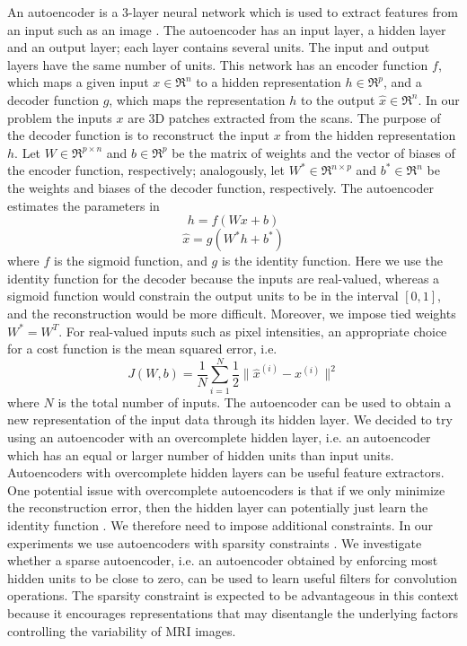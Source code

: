 \documentclass[a4paper,10pt]{article}
\begin{document}
\noindent An autoencoder is a 3-layer neural network which is used to extract features from an input such as an image \cite{practical}. The autoencoder has an input layer, a hidden layer and an output layer; each layer contains several units. The input and output layers have the same number of units. This network has an encoder function $f$, which maps a given input $x \in \Re^{n}$  to a hidden representation $h \in \Re^{p}$, and a decoder function $g$, which maps the representation $h$ to the output $\hat{x} \in \Re^{n}$. In our problem the inputs $x$ are 3D patches extracted from the scans. The purpose of the decoder function is to reconstruct the input $x$ from the hidden representation $h$. Let $W \in \Re^{p\times n}$ and $b \in \Re^{p}$ be the matrix of weights and the vector of biases of the encoder function, respectively; analogously, let $W^{*} \in \Re^{n\times p}$ and $b^{*} \in \Re^{n}$ be the weights and biases of the decoder function, respectively. The autoencoder estimates the parameters in  
\begin{equation}
h = f(Wx+b)
\end{equation}
\begin{equation}
\hat{x} = g(W^{*}h+b^{*})
\end{equation}
where $f$ is the sigmoid function, and $g$ is the identity function. Here we use the identity function for the decoder because the inputs are real-valued, whereas a sigmoid function would constrain the output units to be in the interval $[0,1]$, and the reconstruction would be more difficult. Moreover, we impose tied weights $W^{*} = W^{T}$. For real-valued inputs such as pixel intensities, an appropriate choice for a cost function is the mean squared error, i.e.
\begin{equation}
J(W,b) = \frac{1}{N}\sum_{i=1}^{N}\frac{1}{2} \| \hat{x}^{(i)} - x^{(i)}\|^2
\end{equation}
where $N$ is the total number of inputs.
The autoencoder can be used to obtain a new representation of the input data through its hidden layer. We decided to try using an autoencoder with an overcomplete hidden layer, i.e. an autoencoder which has an equal or larger number of hidden units than input units. Autoencoders with overcomplete hidden layers can be useful feature extractors. One potential issue with overcomplete autoencoders is that if we only minimize the reconstruction error, then the hidden layer can potentially just learn the identity function \cite{practical}. We therefore need to impose additional constraints. In our experiments we use autoencoders with sparsity constraints \cite{sparse}. We investigate whether a sparse autoencoder, i.e. an autoencoder obtained by enforcing most hidden units to be close to zero, can be used to learn useful filters for convolution operations. The sparsity constraint is expected to be advantageous in this context because it encourages representations that may disentangle the underlying factors controlling the variability of MRI images.
\end{document}
